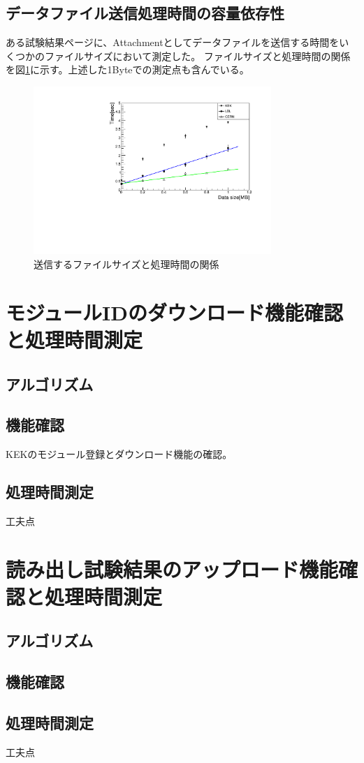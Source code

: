 \subsection{データファイル送信処理時間の容量依存性}
ある試験結果ページに、Attachmentとしてデータファイルを送信する時間をいくつかのファイルサイズにおいて測定した。
ファイルサイズと処理時間の関係を図\ref{datasize_vs_time}に示す。上述した1Byteでの測定点も含んでいる。

\begin{figure}[bpt]\centering
\includegraphics[width=9cm,angle=270]{datasize_vs_time.pdf}
\caption[送信するファイルサイズと処理時間の関係]{送信するファイルサイズと処理時間の関係}
\label{datasize_vs_time}
\end{figure}

\section{モジュールIDのダウンロード機能確認と処理時間測定}
\subsection{アルゴリズム}
\subsection{機能確認}
KEKのモジュール登録とダウンロード機能の確認。
\subsection{処理時間測定}
工夫点
\section{読み出し試験結果のアップロード機能確認と処理時間測定}
\subsection{アルゴリズム}
\subsection{機能確認}
\subsection{処理時間測定}

工夫点

